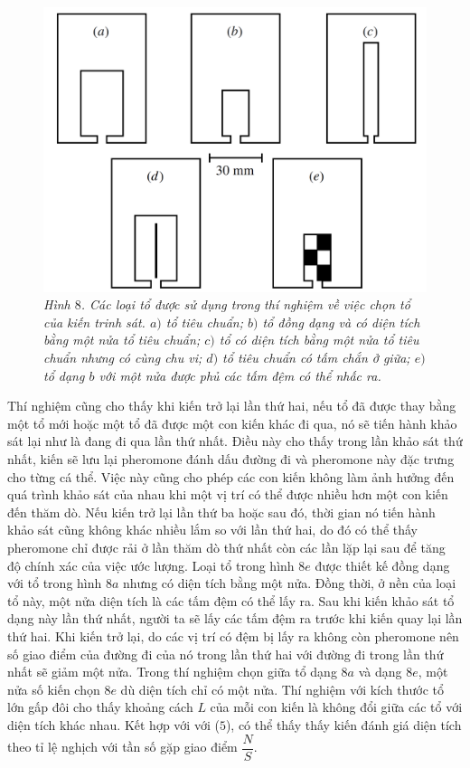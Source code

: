 \begin{multicols}{2}
	\begin{figure}[H]
		\vspace*{-5pt}
		\centering
		\captionsetup{labelformat= empty, justification=centering}
		\includegraphics[width=1\linewidth]{11}
		\caption{\small\textit{\color{toanhocdoisong}Hình $8$. Các loại tổ được sử dụng trong thí nghiệm về việc chọn tổ của kiến trinh sát. $a)$ tổ tiêu chuẩn; $b)$ tổ đồng dạng và có diện tích bằng một nửa tổ tiêu chuẩn; $c)$ tổ có diện tích bằng một nửa tổ tiêu chuẩn nhưng có cùng chu vi; $d)$ tổ tiêu chuẩn có tấm chắn ở giữa; $e)$ tổ dạng $b$ với một nửa được phủ các tấm đệm có thể nhấc ra.}}
		\vspace*{-10pt}
	\end{figure}
	Thí nghiệm cũng cho thấy khi kiến trở lại lần thứ hai, nếu tổ đã được thay bằng một tổ mới hoặc một tổ đã được một con kiến khác đi qua, nó sẽ tiến hành khảo sát lại như là đang đi qua lần thứ nhất. Điều này cho thấy trong lần khảo sát thứ nhất, kiến sẽ lưu lại pheromone đánh dấu đường đi và pheromone này đặc trưng cho từng cá thể. Việc này cũng cho phép các con kiến không làm ảnh hưởng đến quá trình khảo sát của nhau khi một vị trí có thể được nhiều hơn một con kiến đến thăm dò.
	\vskip 0.1cm
	Nếu kiến trở lại lần thứ ba hoặc sau đó, thời gian nó tiến hành khảo sát cũng không khác nhiều lắm so với lần thứ hai, do đó có thể thấy pheromone chỉ được rải ở lần thăm dò thứ nhất còn các lần lặp lại sau để tăng độ chính xác của việc ước lượng.
	\vskip 0.1cm
	Loại tổ trong hình $8e$ được thiết kế đồng dạng với tổ trong hình $8a$ nhưng có diện tích bằng một nửa. Đồng thời, ở nền của loại tổ này, một nửa diện tích là các tấm đệm có thể lấy ra. Sau khi kiến khảo sát tổ dạng này lần thứ nhất, người ta sẽ lấy các tấm đệm ra trước khi kiến quay lại lần thứ hai. Khi kiến trở lại, do các vị trí có đệm bị lấy ra không còn pheromone nên số giao điểm của đường đi của nó trong lần thứ hai với đường đi trong lần thứ nhất sẽ giảm một nửa. Trong thí nghiệm chọn giữa tổ dạng $8a$ và dạng $8e$, một nửa số kiến chọn $8e$ dù diện tích chỉ có một nửa. Thí nghiệm với kích thước tổ lớn gấp đôi cho thấy khoảng cách $L$ của mỗi con kiến là không đổi giữa các tổ với diện tích khác nhau. Kết hợp với với ($5$), có thể thấy thấy kiến đánh giá diện tích theo tỉ lệ nghịch với tần số gặp giao điểm $\dfrac{N}{S}$.

\end{multicols}
